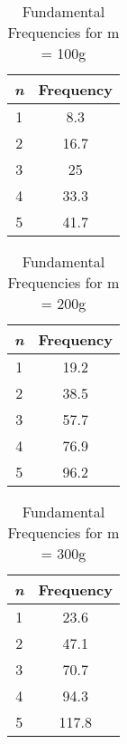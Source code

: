 

\begin{table}[H]
    \centering
    \begin{tabular}{|c|c|}
    \hline
        \textit{n} & Frequency \\ 
        \hline
        \hline
        1 & 8.3 \\
        \hline
        2 & 16.7 \\ 
        \hline
        3 & 25 \\ 
        \hline
        4 & 33.3 \\ 
        \hline
        5 & 41.7 \\ 
        \hline
        \hline
    \end{tabular}
    \caption{Fundamental Frequencies for m = 100g}
\end{table}


\begin{table}[H]
    \centering
    \begin{tabular}{|c|c|}
    \hline
        \textit{n} & Frequency \\ 
        \hline
        \hline
        1 & 19.2 \\ 
        \hline
        2 & 38.5 \\ 
        \hline
        3 & 57.7 \\ 
        \hline
        4 & 76.9 \\ 
        \hline
        5 & 96.2 \\ 
        \hline
        \hline
    \end{tabular}
    \caption{Fundamental Frequencies for m = 200g}
\end{table}

\begin{table}[H]
    \centering
    \begin{tabular}{|c|c|}
    \hline
        \textit{n} & Frequency \\ 
        \hline
        \hline
        1 & 23.6 \\ 
        \hline
        2 & 47.1 \\ 
        \hline
        3 & 70.7 \\ 
        \hline
        4 & 94.3 \\ 
        \hline
        5 & 117.8 \\ 
        \hline
        \hline
    \end{tabular}
    \caption{Fundamental Frequencies for m = 300g}
\end{table}

